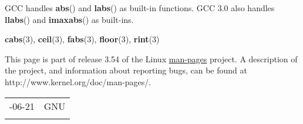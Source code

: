\documentclass[]{article}
\let\realtextbf=\textbf
\renewcommand{\textbf}[1]{\textcolor{boldcolor}{\realtextbf{#1}}}
\renewcommand{\emph}[1]{\underline{#1}}
\begin{document}
GCC handles \textbf{abs}() and \textbf{labs}() as built-in functions.
GCC 3.0 also handles \textbf{llabs}() and \textbf{imaxabs}() as
built-ins.


\textbf{cabs}(3), \textbf{ceil}(3), \textbf{fabs}(3), \textbf{floor}(3),
\textbf{rint}(3)


This page is part of release 3.54 of the Linux \emph{man-pages} project.
A description of the project, and information about reporting bugs, can
be found at http://www.kernel.org/doc/man-pages/.

\begin{longtable}[c]{@{}ll@{}}
\toprule\addlinespace
2013-06-21 & GNU
\\\addlinespace
\bottomrule
\end{longtable}
\end{document}
